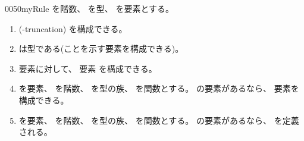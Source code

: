 \documentclass[index]{subfiles}
\begin{document}
\begin{myBlock}{0050}{myRule}
  を階数、
  を型、
  を要素とする。
  \begin{enumerate}
  \item {}
    (-truncation) 
    を構成できる。
  \item {}は型である(ことを示す要素を構成できる)。
  \item 要素に対して、
    要素
    を構成できる。
  \item {}を要素、
    を階数、
    を型の族、
    を関数とする。
    の要素があるなら、
    要素を構成できる。
  \item {}を要素、
    を階数、
    を型の族、
    を関数とする。
    の要素があるなら、
    を定義される。
  \end{enumerate}
\end{myBlock}
\end{document}
